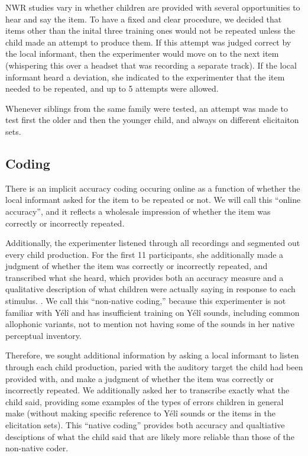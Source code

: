\documentclass[english,,man,floatsintext]{apa6}
\begin{document}
NWR studies vary in whether children are provided with several opportunities to hear and say the item. To have a fixed and clear procedure, we decided that items other than the inital three training ones would not be repeated unless the child made an attempt to produce them. If this attempt was judged correct by the local informant, then the experimenter would move on to the next item (whispering this over a headset that was recording a separate track). If the local informant heard a deviation, she indicated to the experimenter that the item needed to be repeated, and up to 5 attempts were allowed.

Whenever siblings from the same family were tested, an attempt was made to test first the older and then the younger child, and always on different elicitaiton sets.

\hypertarget{coding}{%
\subsection{Coding}\label{coding}}

There is an implicit accuracy coding occuring online as a function of whether the local informant asked for the item to be repeated or not. We will call this \enquote{online accuracy}, and it reflects a wholesale impression of whether the item was correctly or incorrectly repeated.

Additionally, the experimenter listened through all recordings and segmented out every child production. For the first 11 participants, she additionally made a judgment of whether the item was correctly or incorrectly repeated, and transcribed what she heard, which provides both an accuracy measure and a qualitative description of what children were actually saying in response to each stimulus. . We call this \enquote{non-native coding,} because this experimenter is not familiar with Yélî and has insufficient training on Yélî sounds, including common allophonic variants, not to mention not having some of the sounds in her native perceptual inventory.

Therefore, we sought additional information by asking a local informant to listen through each child production, paried with the auditory target the child had been provided with, and make a judgment of whether the item was correctly or incorrectly repeated. We additionally asked her to transcribe exactly what the child said, providing some examples of the types of errors children in general make (without making specific reference to Yélî sounds or the items in the elicitation sets). This \enquote{native coding} provides both accuracy and qualtiative desciptions of what the child said that are likely more reliable than those of the non-native coder.
\end{document}
